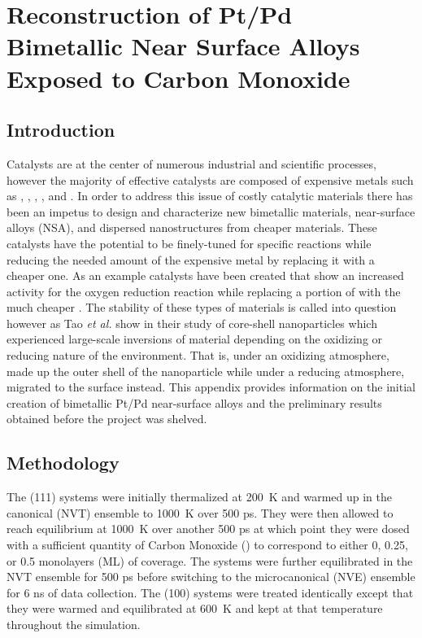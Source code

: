 
\chapter{Reconstruction of Pt/Pd Bimetallic Near Surface Alloys Exposed to Carbon Monoxide}


\section{Introduction}


Catalysts are at the center of numerous industrial and scientific processes,
however the majority of effective catalysts are composed of expensive metals
such as , , , , and .  In order to address
this issue of costly catalytic materials there has been an impetus to design
and characterize new bimetallic materials,\citep{Yu:2012by, Han:2015qr}
near-surface alloys (NSA),\citep{Jan-Kundsen:2007fe, Stephens:2011bv} and
dispersed nanostructures\citep{Shibata:2002hh,Kugai:2011rt} from cheaper
materials.  These catalysts have the potential to be finely-tuned for specific
reactions while reducing the needed amount of the expensive metal by replacing
it with a cheaper one. As an example  catalysts have been created
that show an increased activity for the oxygen reduction reaction while
replacing a portion of  with the much cheaper
.\cite{Stamenkovic:2007kk,Tuaev:2013fk} The stability of these types of
materials is called into question however as Tao {\em et al.} show in their
study of  core-shell nanoparticles which experienced large-scale
inversions of material depending on the oxidizing or reducing nature of the
environment.\citep{Tao:2008aa} That is, under an oxidizing atmosphere, 
made up the outer shell of the nanoparticle while under a reducing atmosphere,
 migrated to the surface instead. This appendix provides information on
the initial creation of bimetallic Pt/Pd near-surface alloys and the
preliminary results obtained before the project was shelved.

\section{Methodology}
The (111) systems were initially thermalized at 200~K and warmed up in the
canonical (NVT) ensemble  to 1000~K over 500 ps. They were then allowed to
reach equilibrium at 1000~K over another 500 ps at which point they were dosed
with a sufficient quantity of Carbon Monoxide () to correspond to either
0, 0.25, or 0.5 monolayers (ML) of coverage. The systems were further
equilibrated in the NVT ensemble for 500 ps before switching to the
microcanonical (NVE) ensemble for 6 ns of data collection. The (100) systems
were treated identically except that they were warmed and equilibrated at 600~K
and kept at that temperature throughout the simulation.

